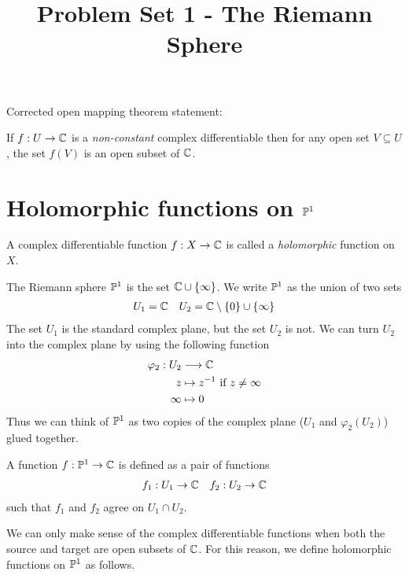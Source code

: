\documentclass{article}
\begin{document}
  \title{Problem Set 1 - The Riemann Sphere}
  \date{}
  \maketitle

    \begin{mdframed}
      Corrected open mapping theorem statement:
      \begin{theorem}
        \label{th:OpenMappingTheorem}
        If $f:U \rightarrow \mathbb{C}$ is a \emph{non-constant} complex differentiable then for any open set $V \subseteq U$, the set $f(V)$ is an open subset of $\mathbb{C}$.
      \end{theorem}
    \end{mdframed}

    \section*{Holomorphic functions on $\mathbb{P}^1$}
    A complex differentiable function $f: X \rightarrow \mathbb{C}$ is called a \emph{holomorphic} function on $X$.

    The Riemann sphere $\mathbb{P}^1$ is the set $\mathbb{C} \cup \left\{\infty\right\}$.
    We write $\mathbb{P}^1$ as the union of two sets
    \begin{align*}
      U_1 = \mathbb{C} && U_2 = \mathbb{C} \setminus \left\{0\right\} \cup \left\{\infty\right\}
    \end{align*}
    The set $U_1$ is the standard complex plane, but the set $U_2$ is not.
    We can turn $U_2$ into the complex plane by using the following function
    \begin{align*}
      \varphi_2 : U_2 &\longrightarrow \mathbb{C} \\
      z &\mapsto z^{-1} \mbox{ if } z \neq \infty \\
      \infty &\mapsto 0
    \end{align*}
    Thus we can think of $\mathbb{P}^1$ as two copies of the complex plane ($U_1$ and $\varphi_2(U_2)$) glued together.

    A function $f: \mathbb{P}^1 \rightarrow \mathbb{C}$ is defined as a pair of functions
    \begin{align*}
      f_1 : U_1 \rightarrow \mathbb{C} && f_2 : U_2 \rightarrow \mathbb{C}
    \end{align*}
    such that $f_1$ and $f_2$ agree on $U_1 \cap U_2$.

    We can only make sense of the complex differentiable functions when both the source and target are open subsets of $\mathbb{C}$. For this reason, we define holomorphic functions on $\mathbb{P}^1$ as follows.
\end{document}
